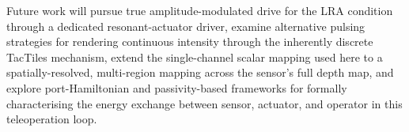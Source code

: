 \documentclass[12pt, a4paper]{report}
\begin{document}
Future work will pursue true amplitude-modulated drive for the LRA condition through a dedicated resonant-actuator driver, examine alternative pulsing strategies for rendering continuous intensity through the inherently discrete TacTiles mechanism, extend the single-channel scalar mapping used here to a spatially-resolved, multi-region mapping across the sensor's full depth map, and explore port-Hamiltonian and passivity-based frameworks for formally characterising the energy exchange between sensor, actuator, and operator in this teleoperation loop.

\begingroup
\raggedright
\printbibliography[heading=bibintoc]
\endgroup
\end{document}
